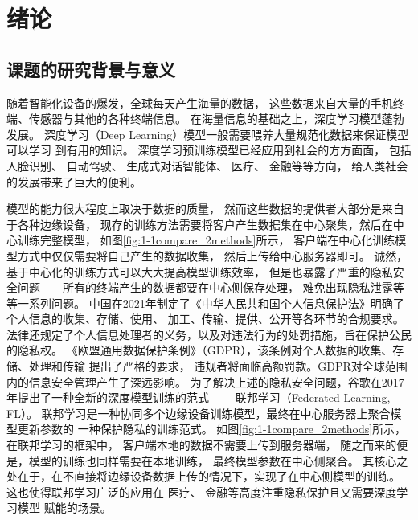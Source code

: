 \chapter{绪论}
\section{课题的研究背景与意义}
随着智能化设备的爆发，全球每天产生海量的数据，
这些数据来自大量的手机终端、传感器与其他的各种终端信息。
在海量信息的基础之上，深度学习模型蓬勃发展。
深度学习（Deep Learning）模型\cite{lim2020federated,DBLP:conf/www/LiuCBZL0C23}一般需要喂养大量规范化数据来保证模型可以学习
到有用的知识。
深度学习预训练模型已经应用到社会的方方面面，
包括人脸识别\cite{XDKD20241125005,XDDJ202424026,XAQY202411004}、
自动驾驶\cite{JSYJ20241211008,QCJS20241213002}、
生成式对话智能体\cite{10.5555/3295222.3295349,ZGGC202411001}、
医疗\cite{YXYZ202410001,ZXYX202409015,JSGG202405004}、
金融\cite{JLJX20241016005,DLXZ202407011}等等方向，
给人类社会的发展带来了巨大的便利。


模型的能力很大程度上取决于数据的质量，
然而这些数据的提供者大部分是来自于各种边缘设备，
现存的训练方法需要将客户产生数据集在中心聚集\cite{JSYJ201407002}，然后在中心训练完整模型，
如图\ref{fig:1-1compare_2methods}所示，
客户端在中心化训练模型方式中仅仅需要将自己产生的数据收集，
然后上传给中心服务器即可。
诚然，基于中心化的训练方式可以大大提高模型训练效率，
但是也暴露了严重的隐私安全问题——所有的终端产生的数据都要在中心侧保存处理，
难免出现隐私泄露等等一系列问题\cite{RJXB202007012}。
中国在2021年制定了《中华人民共和国个人信息保护法》\cite{persionsafe}明确了个人信息的收集、存储、使用、
加工、传输、提供、公开等各环节的合规要求。
法律还规定了个人信息处理者的义务，以及对违法行为的处罚措施，旨在保护公民的隐私权。
《欧盟通用数据保护条例》\cite{eupersonsafe}（GDPR），该条例对个人数据的收集、存储、处理和传输
提出了严格的要求，
违规者将面临高额罚款。GDPR对全球范围内的信息安全管理产生了深远影响。
为了解决上述的隐私安全问题，谷歌在2017年提出了一种全新的深度模型训练的范式——
联邦学习\cite{mcmahan2017communication, karimireddy2020scaffold}（Federated Learning, FL）。
联邦学习是一种协同多个边缘设备训练模型，最终在中心服务器上聚合模型更新参数的
一种保护隐私的训练范式。
如图\ref{fig:1-1compare_2methods}所示，
在联邦学习的框架中，
客户端本地的数据不需要上传到服务器端，
随之而来的便是，模型的训练也同样需要在本地训练，
最终模型参数在中心侧聚合。
其核心之处在于，在不直接将边缘设备数据上传的情况下，实现了在中心侧模型的训练。
这也使得联邦学习广泛的应用在
医疗\cite{SJSJ202409003,JSJA20240510007,pfitzner2021federated,rieke2020future,sheller2020federated}、
金融\cite{DNXJ202403013,byrd2020differentially,imteaj2022leveraging,nevrataki2023survey}等高度注重隐私保护且又需要深度学习模型
赋能的场景。

